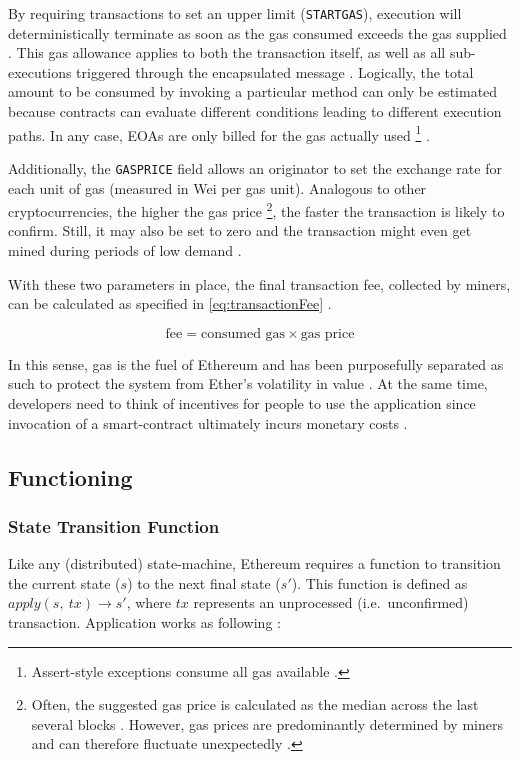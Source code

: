 By requiring transactions to set an upper limit (\texttt{STARTGAS}), execution will deterministically terminate as soon as the gas consumed exceeds the gas supplied \cite[p.~33]{Antonopoulos.2018}. This gas allowance applies to both the transaction itself, as well as all sub-executions triggered through the encapsulated message \cite[p.~19]{ethereumWhitepaperGitHub}. Logically, the total amount to be consumed by invoking a particular method can only be estimated because contracts can evaluate different conditions leading to different execution paths. In any case, \acp{EOA} are only billed for the gas actually used \footnote{Assert-style exceptions consume all gas available \cite[p.~75]{solidityDocs}.} \cite[p.~154]{Antonopoulos.2018}. 

Additionally, the \texttt{GASPRICE} field allows an originator to set the exchange rate for each unit of gas (measured in Wei per gas unit). Analogous to other cryptocurrencies, the higher the gas price \footnote{Often, the suggested gas price is calculated as the median across the last several blocks \cite[p.~153]{Antonopoulos.2018}. However, gas prices are predominantly determined by miners and can therefore fluctuate unexpectedly \cite[p.~54]{Antonopoulos.2018}.}, the faster the transaction is likely to confirm. Still, it may also be set to zero and the transaction might even get mined during periods of low demand \cite[p.~153]{Antonopoulos.2018}. 

With these two parameters in place, the final transaction fee, collected by miners, can be calculated as specified in \autoref{eq:transactionFee} \cite[p.~53]{Antonopoulos.2018} \cite[p.~20]{ethereumWhitepaperGitHub}.

\begin{equation}
\label{eq:transactionFee}
\text{fee} = \text{consumed gas} \times \text{gas price}
\end{equation}

In this sense, gas is the fuel of Ethereum and has been purposefully separated as such to protect the system from Ether's volatility in value \cite[p.~152]{Antonopoulos.2018}. At the same time, developers need to think of incentives for people to use the application since invocation of a smart-contract ultimately incurs monetary costs \cite[p.~4]{blockchainTechnologyGrowth}. 

\subsection{Functioning}
\subsubsection{State Transition Function}
\label{sec:stateTransition}
Like any (distributed) state-machine, Ethereum requires a function to transition the current state ($s$) to the next final state ($s'$). This function is defined as $apply(s,\ tx) \rightarrow s'$, where $tx$ represents an unprocessed (i.e.~unconfirmed) transaction. Application works as following \cite[p.~20]{ethereumWhitepaperGitHub}:  

